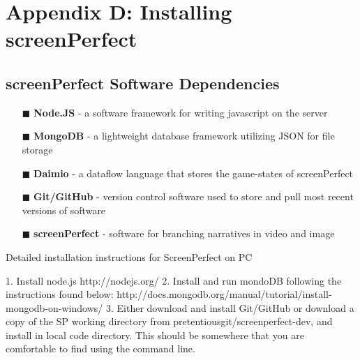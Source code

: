 
\chapter{Appendix D: Installing screenPerfect} %

\label{AppendixD} %



\section{screenPerfect Software Dependencies}
\begin{itemize}
\item[\tiny{$\blacksquare$}] \textbf{Node.JS} - a software framework for writing javascript on the server
\item[\tiny{$\blacksquare$}] \textbf{MongoDB} - a lightweight database framework utilizing JSON for file storage
\item[\tiny{$\blacksquare$}] \textbf{Daimio} - a dataflow language that stores the game-states of screenPerfect
\item[\tiny{$\blacksquare$}] \textbf{Git/GitHub} - version control software used to store and pull most recent versions of software
\item[\tiny{$\blacksquare$}] \textbf{screenPerfect} - software for branching narratives in video and image
\end{itemize}


Detailed installation instructions for ScreenPerfect on PC

1. Install node.js
	http://nodejs.org/ 
2. Install and run mondoDB following the instructions found below:
	http://docs.mongodb.org/manual/tutorial/install-mongodb-on-windows/
3. Either download and install Git/GitHub or download a copy of the SP working directory from pretentiousgit/screenperfect-dev, and install in local code directory. This should be somewhere that you are comfortable to find using the command line.

